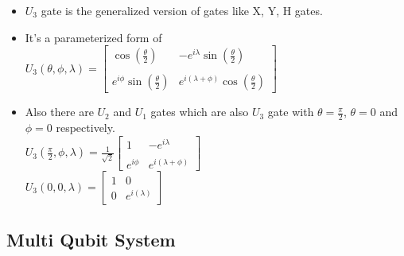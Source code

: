 \documentclass{article}
\begin{document}
\begin{itemize}
    \item  $U_{3}$ gate is the generalized version of gates like X, Y, H gates.
    \item It's a parameterized form of 
$U_{3}(\theta,\phi,\lambda) = 
\begin{bmatrix}\cos(\frac{\theta}{2}) & -e^{i\lambda}\sin(\frac{\theta}{2} )\\ \\ e^{i\phi}\sin(\frac{\theta}{2})& e^{i(\lambda+\phi)}\cos(\frac{\theta}{2})
\end{bmatrix} $
    \item Also there are $U_{2}$ and $U_{1}$ gates which are also $U_{3}$ gate with $\theta = \frac{\pi}{2}$, $\theta = 0$ and $\phi = 0$ respectively.\\
$U_{3}(\frac{\pi}{2},\phi,\lambda) = \frac{1}{\sqrt{2}}
\begin{bmatrix}1 & -e^{i\lambda}\\ \\e^{i\phi}& e^{i(\lambda+\phi)}
\end{bmatrix} $\\
\vspace{0.2cm}
$U_{3}(0,0,\lambda) = 
\begin{bmatrix}1 & 0\\ 0 & e^{i(\lambda)}
\end{bmatrix} $

\end{itemize}

\subsection{Multi Qubit System}
\label{subsec:Multi Qubit System}
\end{document}
